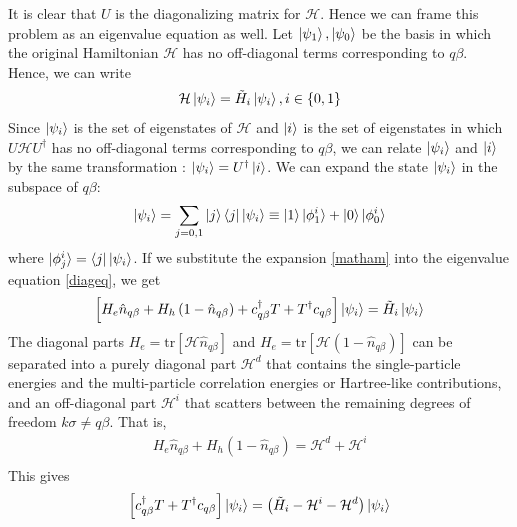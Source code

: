 \documentclass[twoside]{report}
\numberwithin{equation}{section}
\begin{document}
It is clear that \(U\) is the diagonalizing matrix for \(\mathcal{H}\). Hence we can frame this problem as an eigenvalue equation as well. Let \(\ket{\psi_1},\ket{\psi_0}\) be the basis in which the original Hamiltonian \(\mathcal{H}\) has no off-diagonal terms corresponding to \(q\beta\). Hence, we can write
\begin{equation}\begin{aligned}
	\label{diageq}
    \mathcal{H} \ket{\psi_i} = \tilde H_i\ket{\psi_i}, i\in\left\{0,1\right\}
\end{aligned}\end{equation}
Since \(\ket{\psi_i}\) is the set of eigenstates of \(\mathcal{H}\) and \(\ket{i}\) is the set of eigenstates in which \(U\mathcal{H} U^\dagger\) has no off-diagonal terms corresponding to \(q\beta\), we can relate \(\ket{\psi_i}\) and \(\ket{i}\) by the same transformation : \(\ket{\psi_i} = U^\dagger\ket{i}\). We can expand the state \(\ket{\psi_i}\) in the subspace of \(q\beta\):
\begin{equation}\begin{aligned}
	\label{matpsi}
\ket{\psi_i} = \sum_{j=0,1} \ket{j}\bra{j}\ket{\psi_i} \equiv \ket{1}\ket{\phi_1^i} + \ket{0}\ket{\phi_0^i}\end{aligned}\end{equation}
where \(\ket{\phi_j^i} = \bra{j}\ket{\psi_i}\). If we substitute the expansion \ref{matham} into the eigenvalue equation \ref{diageq}, we get
\begin{equation}\begin{aligned}
	\left[H_e \hat n_{q\beta} + H_h \left(1 - \hat n_{q\beta}\right) + c^\dagger_{q\beta}T + T^\dagger c_{q\beta}\right]\ket{\psi_i} = \tilde H_i\ket{\psi_i}
\end{aligned}\end{equation}
The diagonal parts \(H_e = \text{tr}\left[\mathcal{H} \hat n_{q\beta}\right]\) and \(H_e = \text{tr}\left[\mathcal{H} \left(1 - \hat n_{q\beta}\right)\right]\) can be separated into a purely diagonal part \(\mathcal{H}^d\) that contains the single-particle energies and the multi-particle correlation energies or Hartree-like contributions, and an off-diagonal part  \(\mathcal{H}^i\) that scatters between the remaining degrees of freedom \(k\sigma \neq q\beta\). That is,
\begin{equation*}
\begin{gathered}
	H_e \hat n_{q\beta} + H_h \left(1 - \hat n_{q\beta}\right) = \mathcal{H}^d + \mathcal{H}^i\\
\end{gathered}
\end{equation*}
This gives
\begin{equation}\begin{aligned}
	\left[c^\dagger_{q\beta}T + T^\dagger c_{q\beta}\right]\ket{\psi_i} = \left(\tilde H_i - \mathcal{H}^i - \mathcal{H}^d\right)\ket{\psi_i}
\end{aligned}\end{equation}
\end{document}
